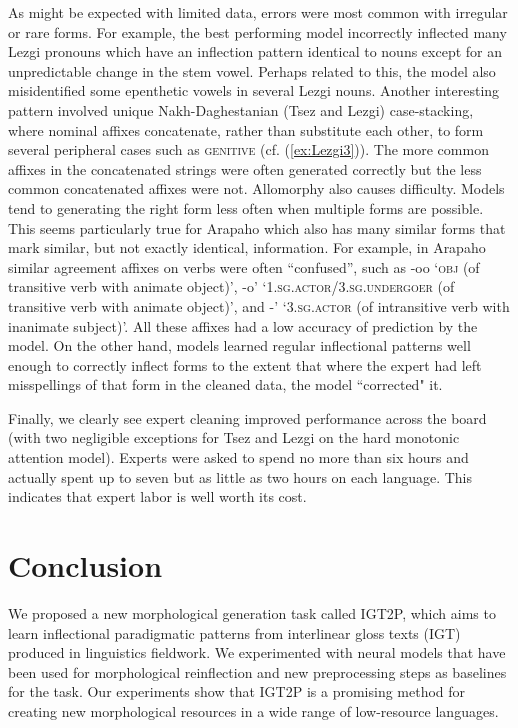 As might be expected with limited data, errors were most common with irregular or rare forms. For example, the best performing model incorrectly inflected many Lezgi pronouns which have an inflection pattern identical to nouns except for an unpredictable change in the stem vowel. Perhaps related to this, the model also misidentified some epenthetic vowels in several Lezgi nouns. Another interesting pattern involved unique Nakh-Daghestanian (Tsez and Lezgi) case-stacking, where nominal affixes concatenate, rather than substitute each other, to form several peripheral cases such as \textsc{genitive} (cf. (\ref{ex:Lezgi3})). The more common affixes in the concatenated strings were often generated correctly but the less common concatenated affixes were not. Allomorphy also causes difficulty. Models tend to generating the right form less often when multiple forms are possible. This seems particularly true for Arapaho which also has many similar forms that mark similar, but not exactly identical, information. For example, in Arapaho similar agreement affixes on verbs were often ``confused'', such as -oo `\textsc{obj} (of transitive verb with animate object)', -o' `\textsc{1.sg.actor/3.sg.undergoer} (of transitive verb with animate object)', and -' `\textsc{3.sg.actor} (of intransitive verb with inanimate subject)'. All these affixes had a low accuracy of prediction by the model. On the other hand, models learned regular inflectional patterns well enough to correctly inflect forms to the extent that where the expert had left misspellings of that form in the cleaned data, the model ``corrected" it.

Finally, we clearly see expert cleaning improved performance across the board (with two negligible exceptions for Tsez and Lezgi on the hard monotonic attention model). Experts were asked to spend no more than six hours and actually spent up to seven but as little as two hours on each language. This indicates that expert labor is well worth its cost. 


\section{Conclusion}

We proposed a new morphological generation task called IGT2P, which aims to learn inflectional paradigmatic patterns from interlinear gloss texts (IGT) produced in linguistics fieldwork. We experimented with neural models that have been used for morphological reinflection and new preprocessing steps as baselines for the task. Our experiments show that IGT2P is a promising method for creating new morphological resources in a wide range of low-resource languages. 

